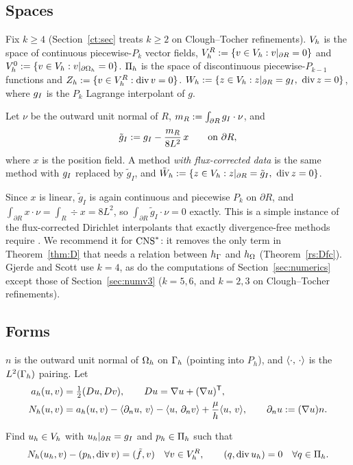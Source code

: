 \subsection*{Spaces}
Fix $k\ge4$ (Section~\ref{ct:sec} treats $k\ge2$ on Clough--Tocher refinements). $V_h$ is the space of continuous piecewise-$P_k$ vector fields, $V_h^R:=\{v\in V_h:v|_{\partial R}=0\}$ and $V_h^0:=\{v\in V_h:v|_{\partial\Omega_h}=0\}$.
$\Pi_h$ is the space of discontinuous piecewise-$P_{k-1}$ functions and $Z_h:=\{v\in V_h^R:\operatorname{div} v=0\}$.
$W_h:=\{z\in V_h:z|_{\partial R}=g_I,\ \operatorname{div} z=0\}$, where $g_I$ is the $P_k$ Lagrange interpolant of $g$.

\begin{definition}\label{rs:def}
Let $\nu$ be the outward unit normal of $R$, $m_R:=\int_{\partial R}g_I\cdot\nu$, and
\[
\tilde g_I:=g_I-\frac{m_R}{8L^2}\,x\qquad\text{on }\partial R,
\]
where $x$ is the position field. A method \emph{with flux-corrected data} is the same method with $g_I$ replaced by $\tilde g_I$, and $\tilde W_h:=\{z\in V_h:z|_{\partial R}=\tilde g_I,\ \operatorname{div} z=0\}$.
\end{definition}
Since $x$ is linear, $\tilde g_I$ is again continuous and piecewise $P_k$ on $\partial R$, and $\int_{\partial R}x\cdot\nu=\int_R\div x=8L^2$, so $\int_{\partial R}\tilde g_I\cdot\nu=0$ exactly. This is a simple instance of the flux-corrected Dirichlet interpolants that exactly divergence-free methods require \cite{EickmannScottTscherpel2025}. We recommend it for $\mathrm{CNS}^\ast$: it removes the only term in Theorem~\ref{thm:D} that needs a relation between $h_\Gamma$ and $h_\Omega$ (Theorem~\ref{rs:Dfc}). Gjerde and Scott use $k=4$, as do the computations of Section~\ref{sec:numerics} except those of Section~\ref{sec:numv3} ($k=5,6$, and $k=2,3$ on Clough--Tocher refinements).

\subsection*{Forms}
$n$ is the outward unit normal of $\Omega_h$ on $\Gamma_h$ (pointing into $P_h$), and $\langle \cdot,\, \cdot\rangle$ is the $L^2(\Gamma_h)$ pairing. Let
\begin{align*}
a_h(u,v)&=\tfrac12(Du,Dv),\qquad Du=\nabla u+(\nabla u)^{\mathsf T},\\
N_h(u,v)&=a_h(u,v)-\langle \partial_n u,\, v\rangle-\langle u,\, \partial_n v\rangle+\frac{\mu}{h}\langle u,\, v\rangle,\qquad \partial_n u:=(\nabla u)n .
\end{align*}

\begin{definition}
Find $u_h\in V_h$ with $u_h|_{\partial R}=g_I$ and $p_h\in\Pi_h$ such that
\[
N_h(u_h,v)-(p_h,\operatorname{div} v)=(\tilde f,v)\quad\forall v\in V_h^R,\qquad (q,\operatorname{div} u_h)=0\quad\forall q\in\Pi_h.
\]
\end{definition}

